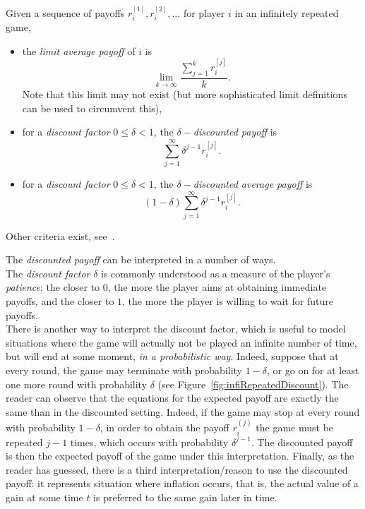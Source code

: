\begin{definition}
Given a sequence of payoffs $r_i^{[1]}, r_i^{[2]}, \ldots$ for player $i$
in an infinitely repeated game,
\begin{itemize}
    \item the \emph{limit average payoff} of $i$ is
    \begin{equation}
        \lim_{k \rightarrow \infty} \frac{\sum_{j = 1}^k r_i^{[j]}}{k}.
        \label{eq:averagePayoffRep}
    \end{equation}
    Note that this limit may not exist (but more sophisticated
    limit definitions can be used to circumvent this),
    \item for a \emph{discount factor} $0 \leq \delta < 1$, the
    \emph{$\delta-$discounted payoff} is
    \begin{equation}
        \sum_{j = 1}^{\infty} \delta^{j-1} r_i^{[j]}.
        \label{eq:discountedPayoffRep}
    \end{equation}
    \item for a \emph{discount factor} $0 \leq \delta < 1$, the
    \emph{$\delta-$discounted average payoff} is
    \begin{equation}
        (1-\delta) \sum_{j = 1}^{\infty} \delta^{j-1} r_i^{[j]}.
        \label{eq:discountedAvgPayoffRep}
    \end{equation}
\end{itemize}
\end{definition}
Other criteria exist, see~\cite[page 315]{MyGTAO}.

The \emph{discounted payoff} can be interpreted in a number of ways.\\
The \emph{discount factor} $\delta$ is commonly understood as a measure
of the player's \emph{patience}: the closer to $0$, the more the player
aims at obtaining immediate payoffs, and the closer to $1$, the more the
player is willing to wait for future payoffs.\\
There is another way to interpret the discount factor, which is useful to model situations where the game will actually not be played an infinite number of time, but will end at some moment, \emph{in a probabilistic way}. Indeed, suppose that at every round, the game may terminate with probability $1-\delta$, or go on for at least one more round with probability $\delta$ (see Figure~\ref{fig:infiRepeatedDiscount}). The reader can observe that the equations for the expected payoff are exactly the same than in the discounted setting.  Indeed, if the game may stop at every round with probability $1-\delta$, in order to obtain the payoff $r_i^{(j)}$ the game must be repeated $j-1$ times, which occurs with probability $\delta^{j-1}$. The discounted payoff is then the
expected payoff of the game under this interpretation.
Finally, as the reader has guessed, there is a third interpretation/reason to use the discounted payoff:
it represents situation where inflation occurs, that is, the actual value of a gain at some time $t$ is preferred to the same gain later in time.

